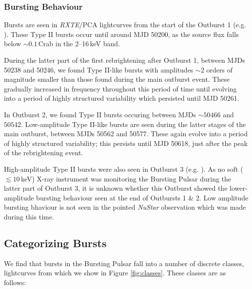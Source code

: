 \subsubsection{Bursting Behaviour}

\par Bursts are seen in \textit{RXTE}/PCA lightcurves from the start of the Outburst 1 (e.g. \citealp{Kouveliotou_BP}).  These Type II bursts occur until around MJD 50200, as the source flux falls below $\sim0.1$\,Crab in the 2--16\,keV band.  
\par During the latter part of the first rebrightening after Outburst 1, between MJDs 50238 and 50246, we found Type II-like bursts with amplitudes $\sim2$ orders of magnitude smaller than those found during the main outburst event.  These gradually increased in frequency throughout this period of time until evolving into a period of highly structured variability which persisted until MJD 50261.
\par In Outburst 2, we found Type II bursts occuring between MJDs $\sim50466$ and $50542$.  Low-amplitude Type II-like bursts are seen during the latter stages of the main outburst, between MJDs 50562 and 50577.  These again evolve into a period of highly structured variability; this persists until MJD 50618, just after the peak of the rebrightening event.
\par High-amplitude Type II bursts were also seen in Outburst 3 (e.g. \citealp{Linares_NewBurst}).  As no soft ($\lesssim10\,$keV) X-ray instrument was monitoring the Bursting Pulsar during the latter part of Outburst 3, it is unknown whether this Outburst showed the lower-amplitude bursting behaviour seen at the end of Outbursts 1 \& 2.  Low amplitude bursting bhaviour is not seen in the pointed \textit{NuStar} observation which was made during this time.

\subsection{Categorizing Bursts}

\label{sec:classes}

\par We find that bursts in the Bursting Pulsar fall into a number of discrete classes, lightcurves from which we show in Figure \ref{fig:classes}.  These classes are as follows:

